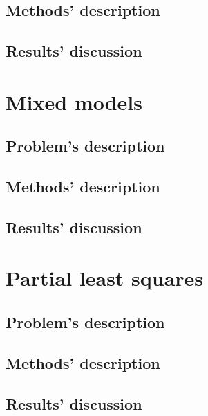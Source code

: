 \documentclass{report}
\begin{document}
\section{Methods' description}

\section{Results' discussion}


\chapter{Mixed models}
\section{Problem's description}

\section{Methods' description}

\section{Results' discussion}


\chapter{Partial least squares}
\section{Problem's description}

\section{Methods' description}

\section{Results' discussion}
\end{document}
